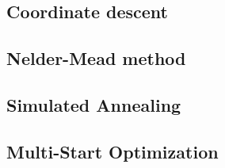 \subsection{Coordinate descent}


\subsection{Nelder-Mead method}


\subsection{Simulated Annealing}


\subsection{Multi-Start Optimization}

